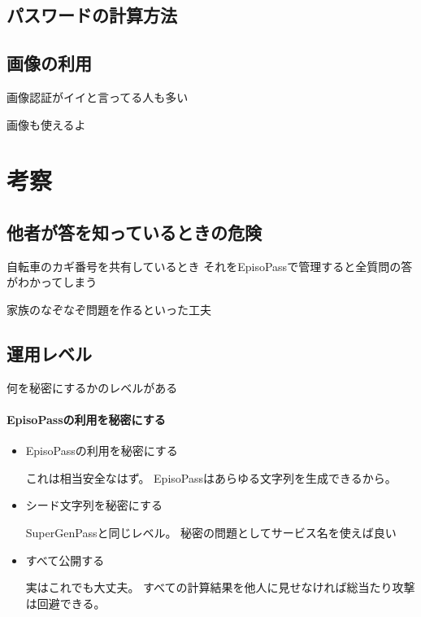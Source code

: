 \documentclass[twoside]{wiss}
\begin{document}
\subsection{パスワードの計算方法}

\subsection{画像の利用}

画像認証がイイと言ってる人も多い

画像も使えるよ

\section{考察}

\subsection{他者が答を知っているときの危険}

自転車のカギ番号を共有しているとき
それをEpisoPassで管理すると全質問の答がわかってしまう

家族のなぞなぞ問題を作るといった工夫

\subsection{運用レベル}

何を秘密にするかのレベルがある

\paragraph{EpisoPassの利用を秘密にする}

\begin{itemize}
\item EpisoPassの利用を秘密にする

これは相当安全なはず。
EpisoPassはあらゆる文字列を生成できるから。

\item シード文字列を秘密にする

SuperGenPassと同じレベル。
秘密の問題としてサービス名を使えば良い

\item すべて公開する

実はこれでも大丈夫。
すべての計算結果を他人に見せなければ総当たり攻撃は回避できる。

\end{itemize}
\end{document}
